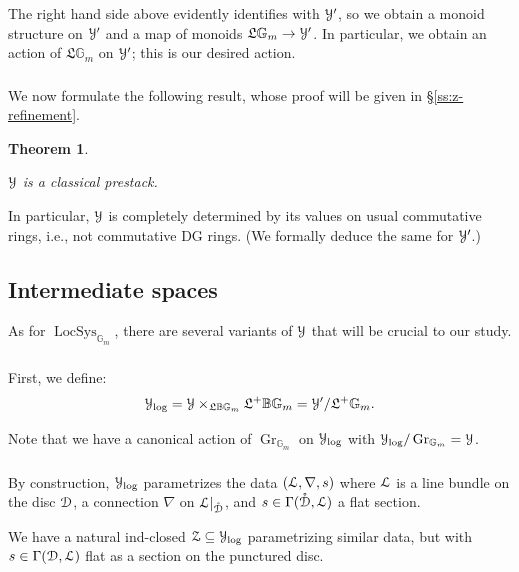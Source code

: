 \documentclass[reqno,11pt]{amsart}
\numberwithin{equation}{subsection}
\newtheorem{thm}{Theorem}[subsubsection]
\theoremstyle{remark}
\newcommand{\bB}{{\mathbb B}}
\newcommand{\bG}{{\mathbb G}}
\newcommand{\sD}{{\EuScript D}}
\newcommand{\sL}{{\EuScript L}}
\newcommand{\sY}{{\EuScript Y}}
\newcommand{\sZ}{{\EuScript Z}}
\newcommand{\fL}{{\mathfrak L}}
\newcommand{\on}{\operatorname}
\newcommand{\Gr}{\on{Gr}}
\newcommand{\LocSys}{\on{LocSys}}
\renewcommand{\o}[1]{\mathring{#1}}
\renewcommand{\subset}{\subseteq}
\begin{document}
The right hand side above evidently
identifies with $\sY^{\prime}$, so we obtain a monoid
structure on $\sY^{\prime}$ and a map of monoids
$\fL \bG_m \to \sY^{\prime}$. In particular, we obtain
an action of $\fL \bG_m$ on $\sY^{\prime}$; this is
our desired action. 

\subsubsection{}

We now formulate the following result, whose proof will
be given in \S \ref{ss:z-refinement}.

\begin{thm}\label{t:cl}

$\sY$ is a classical prestack.

\end{thm}

In particular, $\sY$ is completely determined by its values
on usual commutative rings, i.e., not commutative DG rings.
(We formally deduce the same for $\sY^{\prime}$.)

\subsection{Intermediate spaces}\label{ss:y-trun}

As for $\LocSys_{\bG_m}$, there are several variants of 
$\sY$ that will be crucial to our
study.

\subsubsection{}

First, we define: 
%
\[
\sY_{\log} = \sY \times_{\fL \bB\bG_m} \fL^+ \bB \bG_m = 
\sY^{\prime}/\fL^+\bG_m.
\]

Note that we have a canonical action of $\Gr_{\bG_m}$ on
$\sY_{\log}$ with $\sY_{\log}/\Gr_{\bG_m} = \sY$.

\subsubsection{}

By construction, $\sY_{\log}$ parametrizes the data
$(\sL,\nabla,s)$ where $\sL$ is a line bundle
on the disc $\sD$, 
a connection $\nabla$ on $\sL|_{\o{\sD}}$, and
$s \in \Gamma(\o{\sD},\sL)$ a flat section. 

We have a natural ind-closed $\sZ \subset \sY_{\log}$ parametrizing
similar data, but with $s \in \Gamma(\sD,\sL)$ flat as a
section on the punctured disc.
\end{document}
